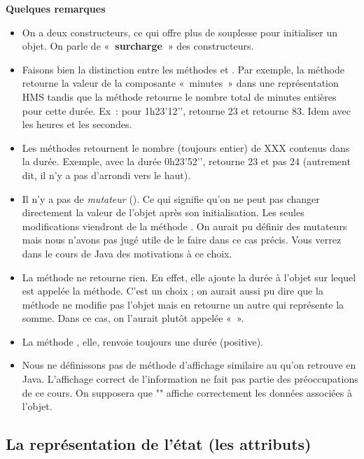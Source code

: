 		\textbf{Quelques remarques}
		\begin{itemize}
			\item
				On a deux constructeurs, ce qui offre plus de souplesse pour initialiser un objet. 
				On parle de «\textbf{~surcharge~}» des constructeurs.
			\item
				Faisons bien la distinction entre les méthodes
				 et . Par
				exemple, la méthode  retourne la valeur
				de la composante «~minutes~» dans une représentation HMS tandis que la
				méthode  retourne le nombre total
				de minutes entières pour cette durée. Ex~: pour 1h23’12’’,
				 retourne 23 et
				 retourne 83. 
				Idem avec les heures et les secondes.
			\item 
				Les méthodes  retournent le nombre
				(toujours entier) de XXX contenus dans la durée. Exemple, avec la durée
				0h23’52’’, 
				retourne 23 et pas 24 (autrement dit, il n’y a pas d’arrondi vers le
				haut).
			\item 
				Il n’y a pas de \textit{mutateur} (). 
				Ce qui signifie qu’on ne peut pas changer directement la valeur de l’objet
				après son initialisation. 
				Les seules modifications viendront de la méthode .
				On aurait pu définir des mutateurs mais nous
				n'avons pas jugé utile de le faire dans ce cas précis.
				Vous verrez dans le cours de Java des motivations à ce choix.
			\item 
				La méthode  ne retourne rien. En effet,
				elle ajoute la durée à l’objet sur lequel est appelée la méthode. C’est
				un choix ; on aurait aussi pu dire que la méthode ne modifie pas
				l’objet mais en retourne un autre qui représente la somme. Dans ce cas,
				on l’aurait plutôt appelée «~».
			\item 
				La méthode , elle, renvoie toujours une
				durée (positive).
			\item 
				Nous ne définissons pas de méthode d'affichage
				similaire au  qu'on retrouve en Java.
				L'affichage correct de l'information ne fait pas partie
				des préoccupations de ce cours.
				On supposera que ""
				affiche correctement les données associées à l'objet.
		\end{itemize}
	
	\subsection{La représentation de l'état (les attributs)}
	
